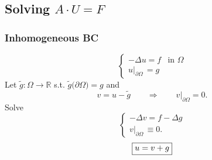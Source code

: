 \subsection{Solving \texorpdfstring{$A \cdot U = F$}{A*U=F}}
    \subsubsection{Inhomogeneous BC}
        \vspace{-0.5em}
        $$
            \begin{cases}
                -\Delta u = f & \textrm{in } \Omega\\
                u\rvert_{\partial \Omega} \, = g
            \end{cases}
        $$
        Let $\tilde{g}: \Omega \to \mathbb{R}$  s.t. $\tilde{g}\big(\partial \Omega\big) = g$ and
        $$
            v = u - \tilde{g} \qquad \Rightarrow \qquad v\rvert_{\partial \Omega} = 0.
        $$
        Solve 
        $$
            \begin{cases}
                -\Delta v = f - \Delta g\\
                v\rvert_{\partial \Omega} \, \equiv 0.
            \end{cases}
        $$
        $$\boxed{%
            u = v + g%
        }$$
        \vspace{-0.75em}
